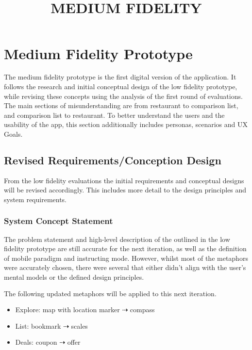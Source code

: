 \documentclass[a4 paper, 12pt]{article}
\title{MEDIUM FIDELITY}
\begin{document}
\section{Medium Fidelity Prototype}
The medium fidelity prototype is the first digital version of the application. It follows the research and initial conceptual design of the low fidelity prototype, while revising these concepts using the analysis of the first round of evaluations. The main sections of misunderstanding are from restaurant to comparison list, and comparison list to restaurant. To better understand the users and the usability of the app, this section additionally includes personas, scenarios and UX Goals. 

\subsection{Revised Requirements/Conception Design}
From the low fidelity evaluations the initial requirements and conceptual designs will be revised accordingly. This includes more detail to the design principles and system requirements. 

    \subsubsection*{System Concept Statement}
    The problem statement and high-level description of the outlined in the low fidelity prototype are still accurate for the next iteration, as well as the definition of mobile paradigm and instructing mode. However, whilst most of the metaphors were accurately chosen, there were several that either didn't align with the user's mental models or the defined design principles. 
    
    The following updated metaphors will be applied to this next iteration.
        \begin{itemize}
            \item Explore: map with location marker $\dashrightarrow$ compass
            \item List: bookmark $\dashrightarrow$ scales
            \item Deals: coupon $\dashrightarrow$ offer
        \end{itemize}
\end{document}
